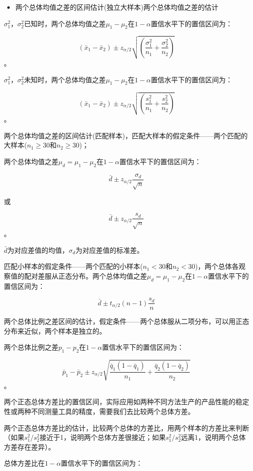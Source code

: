 \documentclass[]{ctexbook}
\providecommand{\tightlist}{%
  \setlength{\itemsep}{0pt}\setlength{\parskip}{0pt}}
\begin{document}
\begin{itemize}
\tightlist
\item
  两个总体均值之差的区间估计(独立大样本)两个总体均值之差的估计
\end{itemize}

\(\sigma_1^2\)，\(\sigma_2^2\)已知时，两个总体均值之差\(\mu_1-\mu_2\)在\(1-\alpha\)置信水平下的置信区间为：

\[(\bar x_1-\bar x_2)\pm z_{\alpha/2}\sqrt{(\frac{\sigma_1^2}{n_1}+\frac{\sigma_2^2}{n_2})}\]。

\(\sigma_1^2\)，\(\sigma_2^2\)未知时，两个总体均值之差\(\mu_1-\mu_2\)在\(1-\alpha\)置信水平下的置信区间为：

\[(\bar x_1-\bar x_2)\pm z_{\alpha/2}\sqrt{(\frac{s_1^2}{n_1}+\frac{s_2^2}{n_2})}\]。

两个总体均值之差的区间估计(匹配样本)，匹配大样本的假定条件------两个匹配的大样本(\(n_1\ge30\)和\(n_2\ge30\))；

两个总体均值之差\(\mu_d=\mu_1-\mu_2\)在\(1-\alpha\)置信水平下的置信区间为：

\[\bar d\pm z_{\alpha/2}\frac{\sigma_d}{\sqrt{n}}\]

或

\[\bar d\pm z_{\alpha/2}\frac{s_d}{\sqrt{n}}\]。

\(\bar d\)为对应差值的均值，\(\sigma_d\)为对应差值的标准差。

匹配小样本的假定条件------两个匹配的小样本(\(n_1<30\)和\(n_2<30\))，两个总体各观察值的配对差服从正态分布。两个总体均值之差\(\mu_d=\mu_1-\mu_2\)在\(1-\alpha\)置信水平下的置信区间为：

\[\bar d\pm t_{\alpha/2}(n-1)\frac{s_d}{n}\]

两个总体比例之差区间的估计，假定条件------两个总体服从二项分布，可以用正态分布来近似，两个样本是独立的。

两个总体比例之差\(p_1-p_2\)在\(1-\alpha\)置信水平下的置信区间为：

\[\bar p_1-\bar p_2\pm z_{\alpha/2}\sqrt{\frac{\bar q_1(1-\bar q_1)}{n_1}+\frac{\bar q_2(1-\bar q_2)}{n_2}}\]。

两个正态总体方差比的置信区间，实际应用如两种不同方法生产的产品性能的稳定性或两种不同测量工具的精度，需要我们去比较两个总体方差。

两个正态总体方差比的估计，比较两个总体的方差比，用两个样本的方差比来判断（如果\(s_1^2/s_2^2\)接近于1，说明两个总体方差很接近；如果\(s_1^2/s_2^2\)远离1，说明两个总体方差存在差异）。

总体方差比在\(1-\alpha\)置信水平下的置信区间为：
\end{document}

